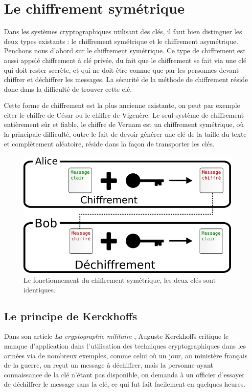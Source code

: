 \section{Le chiffrement symétrique}
Dans les systèmes cryptographiques utilisant des clés, il faut bien
distinguer les deux types existants : le chiffrement symétrique et le
chiffrement asymétrique. Penchons nous d'abord sur le chiffrement
symétrique. Ce type de chiffrement est aussi appelé chiffrement à clé
privée, du fait que le chiffrement se fait via une clé qui doit rester
secrète, et qui ne doit être connue que par les personnes devant
chiffrer et déchiffrer les messages. La sécurité de la méthode de
chiffrement réside donc dans la difficulté de trouver cette
clé. 

Cette forme de chiffrement est la plus ancienne existante, on peut par
exemple citer le chiffre de César ou le chiffre de Vigenère. Le seul
système de chiffrement entièrement sûr et fiable, le chiffre de Vernam
est un chiffrement symétrique, où la principale difficulté, outre le
fait de devoir générer une clé de la taille du texte et complètement
aléatoire, réside dans la façon de transporter les clés.

\begin{figure}[h]
  \begin{center}
    \includegraphics[scale=0.5]{images/ChiffrementSymetrique.png}
  \end{center}
  \caption{Le fonctionnement du chiffrement symétrique, les deux clés
    sont identiques.}
  \label{fig:ChiffrementSymetrique}
\end{figure}

\subsection{Le principe de Kerckhoffs\label{sec:PrincipeKerckhoffs}}
Dans son article \emph{La cryptographie militaire}
\cite{CryptographieMilitaire1,CryptographieMilitaire2}, Auguste
Kerckhoffs critique le manque d'application dans l'utilisation des
techniques cryptographiques dans les armées via de nombreux exemples,
comme celui où un jour, au ministère français de la guerre, on
reçut
un message à déchiffrer, mais la personne ayant connaissance de la clé
n'étant pas disponible, on demanda à un officier d'essayer de
déchiffrer le message sans la clé, ce qui fut fait facilement en
quelques heures.

